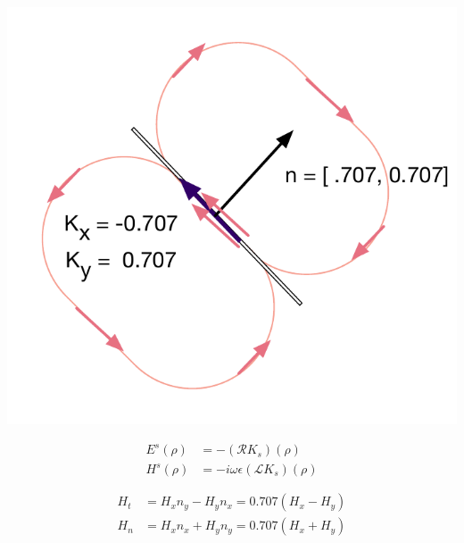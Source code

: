 \documentclass{article}
\newcommand{\0}{\varnothing}
\begin{document}
\begin{minipage}{0.35\textwidth}
\begin{center}
\includegraphics[width=1\columnwidth]{figures/Seg45}
\end{center}
\end{minipage}
\begin{minipage}{0.5\textwidth}
\begin{align*}
    E^s(\rho) &= - (\mathcal{R}K_s)(\rho)\\
    H^s(\rho) &= -i\omega\epsilon(\mathcal{L}K_s)(\rho)\\ \\
 \end{align*}
 \begin{align*}
 	H_t &= H_x n_y - H_y n_x = 0.707 (H_x-H_y)\\
  	H_n &= H_x n_x + H_y n_y = 0.707 (H_x+H_y)
 \end{align*}
 \end{minipage}
\end{document}
